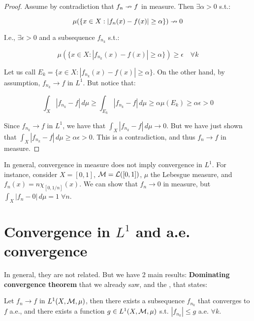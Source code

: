 \begin{proof}
    Assume by contradiction that $f_n \nrightarrow f$ in measure.
    Then $\exists \alpha > 0$ s.t.:

    $$\mu(\{x \in X: |f_n(x) - f(x)| \geq \alpha\}) \nrightarrow 0$$

    I.e., $\exists \epsilon > 0$ and a subsequence $f_{n_k}$ s.t.:

    $$\mu(\{x \in X: |f_{n_k}(x) - f(x)| \geq \alpha\}) \geq \epsilon \quad \forall k$$

    Let us call $E_k = \{x \in X: |f_{n_k}(x) - f(x)| \geq \alpha\}$.
    On the other hand, by assumption, $f_{n_k} \to f$ in $L^1$.
    But notice that:

    $$\int_X |f_{n_k} - f| \, d\mu \geq \int_{E_k} |f_{n_k} - f| \, d\mu \geq \alpha \mu(E_k) \geq \alpha \epsilon > 0$$

    Since $f_{n_k} \to f$ in $L^1$, we have that $\int_X |f_{n_k} - f| \, d\mu \to 0$. 
    But we have just shown that $\int_X |f_{n_k} - f| \, d\mu \geq \alpha \epsilon > 0$.
    This is a contradiction, and thus $f_n \to f$ in measure.
\end{proof}

\begin{fremark}
    In general, convergence in measure does not imply convergence in $L^1$.
    For instance, consider $X = [0, 1]$, $\mathcal{M} = \mathcal{L}([0, 1])$, $\mu$ the Lebesgue measure,
    and $f_n(x) = n \chi_{[0, 1/n]}(x)$. We can show that $f_n \to 0$ in measure, but
    $\int_X |f_n - 0| \, d\mu = 1 \; \forall n$.
\end{fremark}

\section{Convergence in $L^1$ and a.e. convergence}

In general, they are not related. But we have 2 main results:
\textbf{Dominating convergence theorem} that we already
saw, and the \textbf{}, 
that states:

\begin{ftheorem}
    Let $f_n \to f$ in $L^1(X, \mathcal{M}, \mu)$, then there exists a subsequence
    $f_{n_k}$ that converges to $f$ a.e., and there exists a function $g \in L^1(X, \mathcal{M}, \mu)$
    s.t. $|f_{n_k}| \leq g$ a.e. $\forall k$.
\end{ftheorem}



